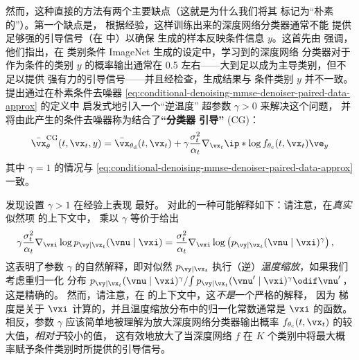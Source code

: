 \documentclass[../../book-main_zh.tex]{subfiles}
\begin{document}
然而，这种直接的方法有两个主要缺点（这就是为什么我们将其
标记为“朴素的”）。第一个缺点是，
根据经验，这样训练出来的深度网络分类器通常不能
提供足够强的引导信号（在
 中）以确保
生成的样本反映条件信息 $y$。这首先由 \citet{Dhariwal2021-hg} 强调，他们指出，在
类别条件 ImageNet 生成的设定中，学习到的深度网络
分类器对于作为条件的类别 $y$ 的概率输出通常在
0.5 左右——大到足以成为主导类别，但不足以提供
强有力的引导信号——并且经检查，生成结果与
条件类别 $y$ 并不一致。\citet{Dhariwal2021-hg} 提出通过在朴素条件去噪器
\eqref{eq:conditional-denoising-mmse-denoiser-paired-data-approx} 的定义中
启发式地引入一个“逆温度”
超参数 $\gamma > 0$ 来解决这个问题，
并将由此产生的条件去噪器称为结合了\textbf{“分类器
引导”}
(CG)：
\begin{equation}\label{eq:conditional-denoising-mmse-denoiser-paired-data-approx-cg}
    \bar{\vx}_{\theta}^{\mathrm{CG}}(t, \vx_t, y)
    =
    \bar{\vx}_{\theta_{\mathrm{d}}}(t, \vx_t)
    + \gamma\frac{\sigma_t^2}{\alpha_t}
    \nabla_{\vx_t}
    \ip*{
        \log f_{\theta_{\mathrm{c}}}(t, \vx_t)
    }{
        \ve_{y}
    }
\end{equation}
其中 $\gamma = 1$ 的情况与
\eqref{eq:conditional-denoising-mmse-denoiser-paired-data-approx} 一致。

\citet{Dhariwal2021-hg} 发现设置 $\gamma > 1$ 在经验上表现
最好。
对此的一种可能解释如下：请注意，在\textit{真实}似然项
 的上下文中，
乘以 $\gamma$ 等价于给出
\begin{align}
    \gamma\frac{\sigma_t^2}{\alpha_t} \nabla_{\vxi}\log p_{\vy \mid
    \vx_t}(\vnu\mid
    \vxi)
    &=
    \frac{\sigma_t^2}{\alpha_t} \nabla_{\vxi}\log \left(
        p_{\vy \mid \vx_t}(\vnu\mid \vxi)^\gamma
    \right), %
\end{align}
这表明了参数 $\gamma$ 的自然解释，即对似然
$p_{\vy \mid \vx_t}$ 执行（逆）\textit{温度缩放}，如果我们考虑重归一化
分布
$ { p_{\vy \mid \vx_t}(\vnu\mid \vxi)^\gamma } / { \int p_{\vy \mid
    \vx_t}(\vnu'\mid
\vxi)^\gamma \odif \vnu' } $，这是精确的。
然而，请注意，在  的上下文中，这\textit{不是}一个严格的解释，
因为
梯度是关于 $\vxi$ 计算的，并且温度缩放分布中的归一化常数通常是 $\vxi$ 的函数。
相反，参数 $\gamma$ 应该简单地被理解为放大深度网络分类器输出概率
$f_{\theta_{\mathrm{c}}}(t, \vx_t)$ 的较大值，\textit{相对于}较小的值，
这有效地放大了当深度网络 $f$ 在 $K$ 个类别中将最大概率赋予条件类别时所提供的引导信号。
\end{document}
